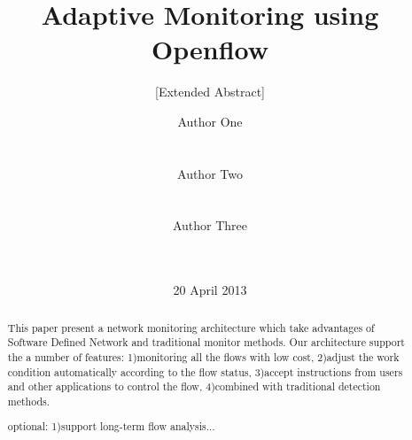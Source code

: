 \documentclass{acm_proc_article-sp}
\begin{document}
\title{Adaptive Monitoring using Openflow}
\subtitle{[Extended Abstract]}

\author{
\alignauthor
Author One\\
       \\
       \\
\alignauthor
Author Two\\
       \\
       \\
\alignauthor
Author Three\\
       \\
       \\
}


\date{20 April 2013}

\maketitle

\balance

\begin{abstract}
This paper present a network monitoring architecture which take advantages of Software Defined Network and traditional monitor methods. Our architecture support the a number of features: 1)monitoring all the flows with low cost, 2)adjust the work condition automatically according to the flow status, 3)accept instructions from users and other applications to control the flow, 4)combined with traditional detection methods.

optional: 1)support long-term flow analysis...
\end{abstract}


\end{document}
